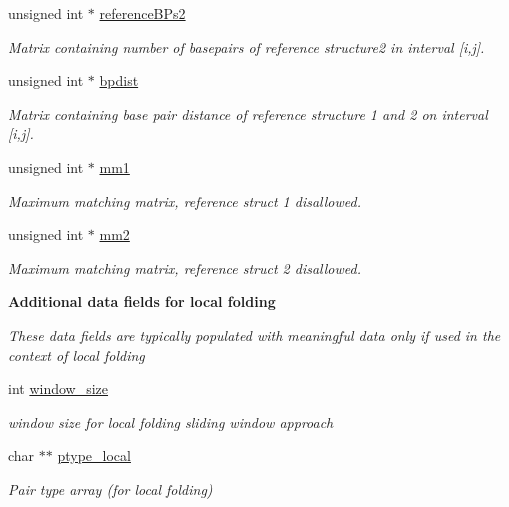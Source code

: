 \begin{Indent}
\begin{DoxyCompactItemize}
unsigned int $\ast$ \mbox{\hyperlink{group__fold__compound_a19187f33433e84683730dedff8544f71}{reference\+B\+Ps2}}
\begin{DoxyCompactList}\small\item\em Matrix containing number of basepairs of reference structure2 in interval \mbox{[}i,j\mbox{]}. \end{DoxyCompactList}\item 
unsigned int $\ast$ \mbox{\hyperlink{group__fold__compound_a5c53e55583ce096148075bc240fc2bce}{bpdist}}
\begin{DoxyCompactList}\small\item\em Matrix containing base pair distance of reference structure 1 and 2 on interval \mbox{[}i,j\mbox{]}. \end{DoxyCompactList}\item 
unsigned int $\ast$ \mbox{\hyperlink{group__fold__compound_a0af5a888bac2ae32107da32776144504}{mm1}}
\begin{DoxyCompactList}\small\item\em Maximum matching matrix, reference struct 1 disallowed. \end{DoxyCompactList}\item 
unsigned int $\ast$ \mbox{\hyperlink{group__fold__compound_a54c0b979274b285a7e093ed54aa3252e}{mm2}}
\begin{DoxyCompactList}\small\item\em Maximum matching matrix, reference struct 2 disallowed. \end{DoxyCompactList}\end{DoxyCompactItemize}
\end{Indent}
\begin{Indent}\textbf{ Additional data fields for local folding}\par
{\em These data fields are typically populated with meaningful data only if used in the context of local folding }\begin{DoxyCompactItemize}
\item 
int \mbox{\hyperlink{group__fold__compound_adacbf7cdfb47d3072683ab509de735f6}{window\+\_\+size}}
\begin{DoxyCompactList}\small\item\em window size for local folding sliding window approach \end{DoxyCompactList}\item 
char $\ast$$\ast$ \mbox{\hyperlink{group__fold__compound_a2ecb8ff5e21190936a8a146be7a251ff}{ptype\+\_\+local}}
\begin{DoxyCompactList}\small\item\em Pair type array (for local folding) \end{DoxyCompactList}\end{DoxyCompactItemize}
\end{Indent}


